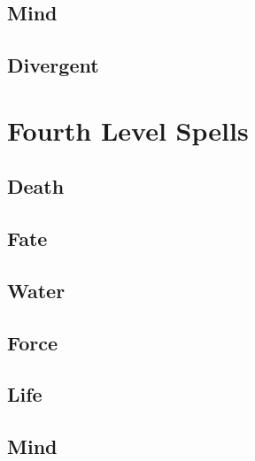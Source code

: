 \begin{multicols}{2}

\subsection{Mind}


\subsection{Divergent}


\end{multicols}

\section{Fourth Level Spells}

\begin{multicols}{2}

\subsection{Death}


\subsection{Fate}


\subsection{Water}


\subsection{Force}


\subsection{Life}


\subsection{Mind}


\end{multicols}
